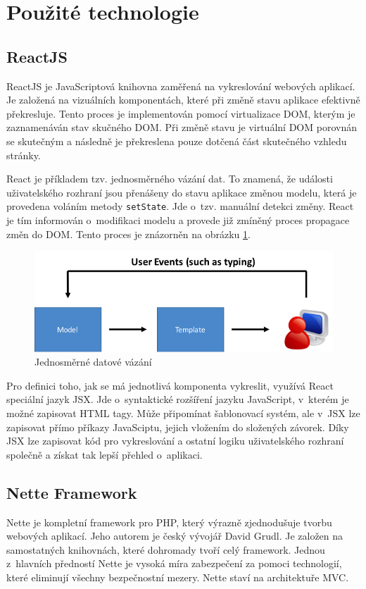 \documentclass[thesis=B,czech]{FITthesis}[2012/06/26]
\begin{document}
\section{Použité technologie}

\subsection{ReactJS}
	ReactJS\cite{reactjs} je JavaScriptová knihovna zaměřená na vykreslování webových aplikací. Je založená na vizuálních komponentách, které při změně stavu aplikace efektivně překresluje. Tento proces je implementován pomocí virtualizace DOM, kterým je zaznamenáván stav skučného DOM. Při změně stavu je virtuální DOM porovnán se skutečným a následně je překreslena pouze dotčená část skutečného vzhledu stránky. \cite{react-crud-app}

	React je příkladem tzv. jednosměrného vázání dat. To znamená, že události uživatelského rozhraní jsou přenášeny do stavu aplikace   změnou modelu, která je provedena voláním metody \verb|setState|. Jde o~tzv. manuální detekci změny. React je tím informován o~modifikaci modelu a provede již zmíněný proces propagace změn do DOM.\cite{data_binding} Tento proces je znázorněn na obrázku \ref{data_binding}.

	\begin{figure}
		\includegraphics[width=\textwidth]{databinding2.png}
		\caption{Jednosměrné datové vázání}\label{data_binding}
	\end{figure}

	Pro definici toho, jak se má jednotlivá komponenta vykreslit, využívá React speciální jazyk JSX. Jde o~syntaktické rozšíření jazyku JavaScript, v~kterém je možné zapisovat HTML tagy. Může připomínat šablonovací systém, ale v~JSX lze zapisovat přímo příkazy JavaSciptu, jejich vložením do složených závorek. Díky JSX lze zapisovat kód pro vykreslování a ostatní logiku uživatelského rozhraní společně a získat tak lepší přehled o~aplikaci.\cite{jsx} 
	
\subsection{Nette Framework}
	Nette je kompletní framework pro PHP, který výrazně zjednodušuje tvorbu webových aplikací. Jeho autorem je český vývojář David Grudl. Je založen na samostatných knihovnách, které dohromady tvoří celý framework. Jednou z~hlavních předností Nette je vysoká míra zabezpečení za pomoci technologií, které eliminují všechny bezpečnostní mezery. Nette staví na architektuře MVC.\cite{nette}
	
\end{document}
